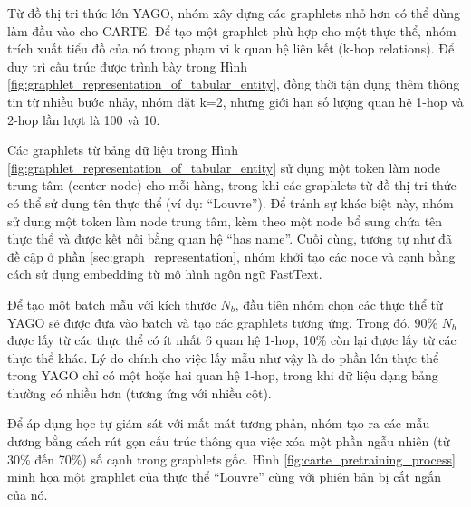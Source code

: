 \documentclass{article}
\begin{document}
Từ đồ thị tri thức lớn YAGO, nhóm xây dựng các graphlets nhỏ hơn có thể dùng làm đầu vào cho CARTE. Để tạo một graphlet phù hợp cho một thực thể, nhóm trích xuất tiểu đồ của nó trong phạm vi k quan hệ liên kết (k-hop relations). Để duy trì cấu trúc được trình bày trong Hình \ref{fig:graphlet_representation_of_tabular_entity}, đồng thời tận dụng thêm thông tin từ nhiều bước nhảy, nhóm đặt k=2, nhưng giới hạn số lượng quan hệ 1-hop và 2-hop lần lượt là 100 và 10.

Các graphlets từ bảng dữ liệu trong Hình \ref{fig:graphlet_representation_of_tabular_entity} sử dụng một token làm node trung tâm (center node) cho mỗi hàng, trong khi các graphlets từ đồ thị tri thức có thể sử dụng tên thực thể (ví dụ: “Louvre”). Để tránh sự khác biệt này, nhóm sử dụng một token làm node trung tâm, kèm theo một node bổ sung chứa tên thực thể và được kết nối bằng quan hệ “has name”. Cuối cùng, tương tự như đã đề cập ở phần \ref{sec:graph_representation}, nhóm khởi tạo các node và cạnh bằng cách sử dụng embedding từ mô hình ngôn ngữ FastText.

Để tạo một batch mẫu với kích thước $N_b$, đầu tiên nhóm chọn các thực thể từ YAGO sẽ được đưa vào batch và tạo các graphlets tương ứng. Trong đó, 90\% $N_b$ được lấy từ các thực thể có ít nhất 6 quan hệ 1-hop, 10\% còn lại được lấy từ các thực thể khác. Lý do chính cho việc lấy mẫu như vậy là do phần lớn thực thể trong YAGO chỉ có một hoặc hai quan hệ 1-hop, trong khi dữ liệu dạng bảng thường có nhiều hơn (tương ứng với nhiều cột).

Để áp dụng học tự giám sát với mất mát tương phản, nhóm tạo ra các mẫu dương bằng cách rút gọn cấu trúc thông qua việc xóa một phần ngẫu nhiên (từ 30\% đến 70\%) số cạnh trong graphlets gốc. Hình \ref{fig:carte_pretraining_process} minh họa một graphlet của thực thể “Louvre” cùng với phiên bản bị cắt ngắn của nó.
\end{document}
